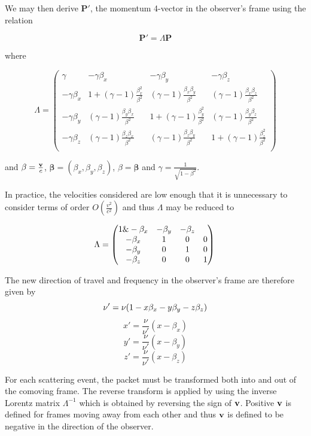 \documentclass[useAMS,usenatbib,usegraphicx]{mnras}
\begin{document}
\noindent We may then derive $\mathbf{P'}$, the momentum 4-vector in the 
observer's frame using the relation

\begin{equation}
	\mathbf{P'}=\Lambda \mathbf{P}	
\end{equation}

\noindent where 

\[
	{\Lambda}=
	 \begin{pmatrix} 
	  \gamma & -\gamma \beta_x & -\gamma \beta_y & -\gamma \beta_z \\
	 -\gamma \beta_x & 1+(\gamma-1)\frac{\beta_x^2}{\beta^2} & (\gamma-1)\frac{\beta_x \beta_y}{\beta^2} & (\gamma-1)\frac{\beta_x \beta_z}{\beta^2} \\
	 -\gamma \beta_y  & (\gamma-1)\frac{\beta_y \beta_x}{\beta^2} & 1+(\gamma-1)\frac{\beta_y^2}{\beta^2} & (\gamma-1)\frac{\beta_y \beta_z}{\beta^2} \\
	 -\gamma \beta_z & (\gamma-1)\frac{\beta_z \beta_x}{\beta^2} & (\gamma-1)\frac{\beta_z \beta_y}{\beta^2} & 1+(\gamma-1)\frac{\beta_z^2}{\beta^2} \\
	 \end{pmatrix}
\]

 \noindent and $\mathbf{\beta}=\frac{{\bf{v}}}{c}$,   $\mathbf{\beta}=(\beta_x,\beta_y,\beta_z)$,   $\beta=\mathbf{\beta}$ and $\gamma = \frac{1}{\sqrt{1-\beta^2}}$.


In practice, the velocities considered are low enough that it is 
unnecessary to consider terms of order $O(\frac{v^2}{c^2})$ and thus 
${\Lambda}$ may be reduced to

\begin{equation}
	{\Lambda}=
	 \begin{pmatrix} 
	 1 \& - \beta_x & - \beta_y & - \beta_z \\
	- \beta_x & 1 & 0 & 0 \\
	- \beta_y  & 0 & 1 & 0\\
	- \beta_z & 0 & 0 & 1 \\
	 \end{pmatrix}
	 \\
\end{equation}

\noindent The new direction of travel and frequency in the observer's 
frame are therefore given by  
\begin{equation}
\nu'=\nu(1-x\beta_x-y\beta_y-z\beta_z) \\
\end{equation}
\[
x'=\frac{\nu}{\nu'}(x-\beta_x) 
\]
\[
y'=\frac{\nu}{\nu'}(x-\beta_y) 
\]
\[
z'=\frac{\nu}{\nu'}(x-\beta_z) 
\]

For each scattering event, the packet must be transformed both into and 
out of the comoving frame. The reverse transform is applied by using the 
inverse Lorentz matrix $\Lambda^{-1}$ which is obtained by reversing the 
sign of $\bf{v}$.  Positive $\bf{v}$ is defined for frames moving away 
from each other and thus $\bf{v}$ is defined to be negative in the 
direction of the observer.

\bsp

\label{lastpage}
\end{document}

